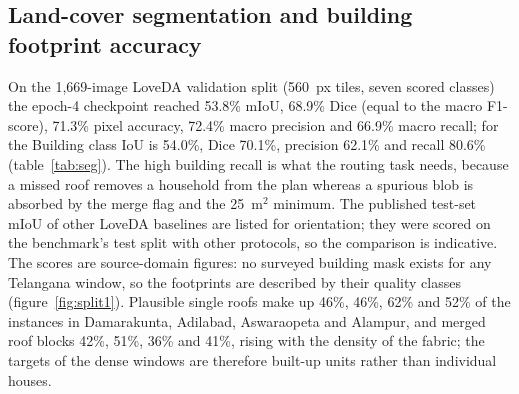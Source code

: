 \documentclass[preprint,12pt]{elsarticle}
\begin{document}
\subsection{Land-cover segmentation and building footprint accuracy}\label{sec:res1}
On the 1{,}669-image LoveDA validation split (560~px tiles, seven scored classes) the epoch-4 checkpoint reached 53.8\% mIoU, 68.9\% Dice (equal to the macro F1-score), 71.3\% pixel accuracy, 72.4\% macro precision and 66.9\% macro recall; for the Building class IoU is 54.0\%, Dice 70.1\%, precision 62.1\% and recall 80.6\% (table~\ref{tab:seg}). The high building recall is what the routing task needs, because a missed roof removes a household from the plan whereas a spurious blob is absorbed by the merge flag and the 25~m$^2$ minimum. The published test-set mIoU of other LoveDA baselines are listed for orientation; they were scored on the benchmark's test split with other protocols, so the comparison is indicative. The scores are source-domain figures: no surveyed building mask exists for any Telangana window, so the footprints are described by their quality classes (figure~\ref{fig:split1}). Plausible single roofs make up 46\%, 46\%, 62\% and 52\% of the instances in Damarakunta, Adilabad, Aswaraopeta and Alampur, and merged roof blocks 42\%, 51\%, 36\% and 41\%, rising with the density of the fabric; the targets of the dense windows are therefore built-up units rather than individual houses.
\end{document}
